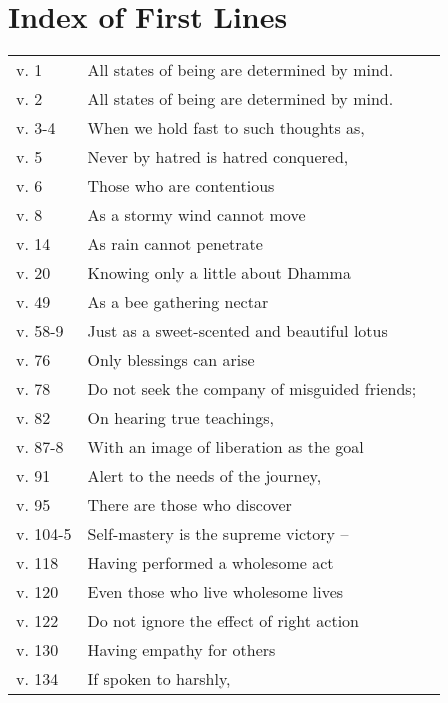 
\chapter{Index of First Lines}

{\smaller
\setlength{\parskip}{0pt}
\setlength{\parindent}{0pt}

\begin{longtable}[c]{llr}
v. 1 & All states of being are determined by mind. & \pageref{dhp-1}\\
v. 2 & All states of being are determined by mind. & \pageref{dhp-2}\\
v. 3-4 & When we hold fast to such thoughts as, & \pageref{dhp-3}\\
v. 5 & Never by hatred is hatred conquered, & \pageref{dhp-5}\\
v. 6 & Those who are contentious & \pageref{dhp-6}\\
v. 8 & As a stormy wind cannot move & \pageref{dhp-8}\\
v. 14 & As rain cannot penetrate & \pageref{dhp-14}\\
v. 20 & Knowing only a little about Dhamma & \pageref{dhp-20}\\
v. 49 & As a bee gathering nectar & \pageref{dhp-49}\\
v. 58-9 & Just as a sweet-scented and beautiful lotus & \pageref{dhp-58}\\
v. 76 & Only blessings can arise & \pageref{dhp-76}\\
v. 78 & Do not seek the company of misguided friends; & \pageref{dhp-78}\\
v. 82 & On hearing true teachings, & \pageref{dhp-82}\\
v. 87-8 & With an image of liberation as the goal & \pageref{dhp-87}\\
v. 91 & Alert to the needs of the journey, & \pageref{dhp-91}\\
v. 95 & There are those who discover & \pageref{dhp-95}\\
v. 104-5 & Self-mastery is the supreme victory -- & \pageref{dhp-104}\\
v. 118 & Having performed a wholesome act & \pageref{dhp-118}\\
v. 120 & Even those who live wholesome lives & \pageref{dhp-120}\\
v. 122 & Do not ignore the effect of right action & \pageref{dhp-122}\\
v. 130 & Having empathy for others & \pageref{dhp-130}\\
v. 134 & If spoken to harshly, & \pageref{dhp-134}\\

\end{longtable}}
